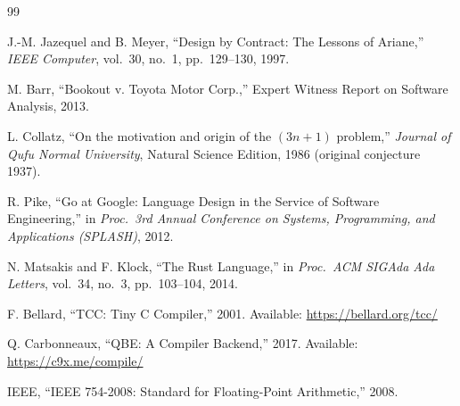 \documentclass[11pt,a4paper]{article}
\begin{document}
\begin{thebibliography}{99}

J.-M. Jazequel and B. Meyer, ``Design by Contract: The Lessons of Ariane,'' \textit{IEEE Computer}, vol.~30, no.~1, pp.~129--130, 1997.

M. Barr, ``Bookout v. Toyota Motor Corp.,'' Expert Witness Report on Software Analysis, 2013.

L. Collatz, ``On the motivation and origin of the $(3n+1)$ problem,'' \textit{Journal of Qufu Normal University}, Natural Science Edition, 1986 (original conjecture 1937).

R. Pike, ``Go at Google: Language Design in the Service of Software Engineering,'' in \textit{Proc.\ 3rd Annual Conference on Systems, Programming, and Applications (SPLASH)}, 2012.

N. Matsakis and F. Klock, ``The Rust Language,'' in \textit{Proc.\ ACM SIGAda Ada Letters}, vol.~34, no.~3, pp.~103--104, 2014.

F. Bellard, ``TCC: Tiny C Compiler,'' 2001. Available: \url{https://bellard.org/tcc/}

Q. Carbonneaux, ``QBE: A Compiler Backend,'' 2017. Available: \url{https://c9x.me/compile/}

IEEE, ``IEEE 754-2008: Standard for Floating-Point Arithmetic,'' 2008.

\end{thebibliography}
\end{document}
